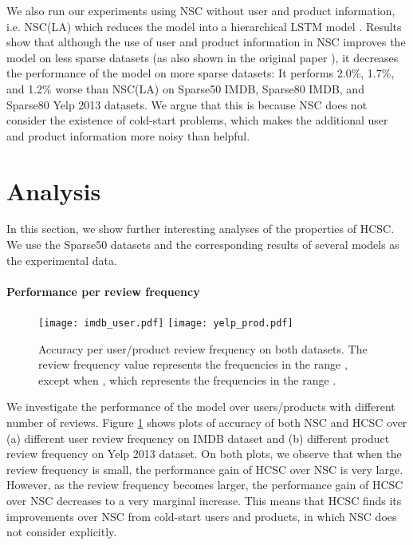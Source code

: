 \documentclass[11pt,a4paper]{article}
\begin{document}
We also run our experiments using NSC without user and product information, i.e. NSC(LA) which reduces the model into a hierarchical LSTM model \cite{yang2016hierarchical}. Results show that although the use of user and product information in NSC improves the model on less sparse datasets (as also shown in the original paper \cite{chen2016neural}), it decreases the performance of the model on more sparse datasets: It performs 2.0\%, 1.7\%, and 1.2\% worse than NSC(LA) on Sparse50 IMDB, Sparse80 IMDB, and Sparse80 Yelp 2013 datasets.
We argue that this is because NSC does not consider the existence of cold-start problems, which makes the additional user and product information more noisy than helpful.

\section{Analysis}

In this section, we show further interesting analyses of the properties of HCSC. We use the Sparse50 datasets and the corresponding results of several models as the experimental data.

\paragraph{Performance per review frequency}

\begin{figure}[t]
    \centering
    \texttt{[image: imdb\_user.pdf]}
    \texttt{[image: yelp\_prod.pdf]}
    \caption{Accuracy per user/product review frequency on both datasets. The review frequency value  represents the frequencies in the range , except when , which represents the frequencies in the range .}
    \label{fig:freq_acc}
\end{figure}

We investigate the performance of the model over users/products with different number of reviews. Figure \ref{fig:freq_acc} shows plots of accuracy of both NSC and HCSC over (a) different user review frequency on IMDB dataset and (b) different product review frequency on Yelp 2013 dataset. On both plots, we observe that when the review frequency is small, the performance gain of HCSC over NSC is very large. However, as the review frequency becomes larger, the performance gain of HCSC over NSC decreases to a very marginal increase. This means that HCSC finds its improvements over NSC from cold-start users and products, in which NSC does not consider explicitly.
\end{document}
